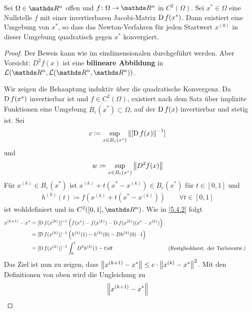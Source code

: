 \begin{Satze}
  Sei $\Omega\in\R^n$ offen und $f\colon\Omega\to\Ren$ in $C^2(\Omega)$.
  Sei $x^{*}\in\Omega $ eine Nullstelle $f$ 
  mit einer invertierbaren Jacobi-Matrix $\D f(x^{*})$.
  Dann existiert eine Umgebung von $x^{*}$, so dass das Newton-Verfahren 
  für jeden Startwert $x^{(0)}$ in dieser Umgebung
  quadratisch gegen $x^{*}$ konvergiert.
\end{Satze}

\begin{proof}
  Der Beweis kann wie im eindimensionalen durchgeführt werden.
  Aber Vorsicht: $D^2f(x)$ ist eine \textbf{bilineare Abbildung} in 
  $\mathcal{L}(\Ren, \mathcal{L}(\Ren, \Ren))$.
  
  Wir zeigen die Behauptung induktiv über die quadratische Konvergenz.
  Da $\D f(x^{*})$ invertierbar ist und $f\in C^2(\Omega) $,
  existiert nach dem Satz über implizite Funktionen
  eine Umgebung $\overline{B_\varepsilon(x^{*})}\subset \Omega$,
  auf der $\D f(x)$ invertierbar und stetig ist. Sei 
  \begin{gather*}
    c\coloneqq \sup_{x\in B_\varepsilon(x^{*})} \nn[[\D f(x)]^{-1}]
  \end{gather*}
  und 
  \begin{gather*}
    w\coloneqq \sup_{x\in B_\varepsilon(x^{*})}\nn[D^2f(x)]
  \end{gather*}
  Für $x^{(k)}\in B_\varepsilon(x^{*}) $ ist 
  $x^{(k)}+t(x^{*}-x^{(k)})\in B_\varepsilon(x^{*})$
  für $t\in [0,1]$ und 
  \begin{gather*}
    h^{(k)}(t) \coloneqq f(x^{(k)}+ t(x^{*}-x^{(k)}))\qquad \forall t\in [0,1]
  \end{gather*}
  ist wohldefiniert und in $C^2([0,1], \Ren)$.
  Wie in \ref{5.4.2} folgt 
  \begin{align*}
    x^{(k+1)}-x^{*} 
    &= [\D f(x^{(k)})]^{-1}\left(
      f(x^{*})-f(x^{(k)})-\D f(x^{(k)})(x^{*}-x^{(k)})
      \right)\\
    &= [\D f(x^{(k)})]^{-1}\left( 
      h^{(k)}(1)-h^{(k)}(0)-Dh^{(k)}(0)\cdot 1
      \right)\\
    &= [\D f(x^{(k)})]^{-1}\int_{0}^{1}D^2h^{(k)}(1-t)dt 
    &&\text{(Restglieddarst. der Taylorentw.)}
  \end{align*}
  Das Ziel ist nun zu zeigen, dass $\nn[x^{(k+1)}-x^{*}] \leq c\cdot \nn[x^{(k)}-x^{*}]^2$.
  Mit den Definitionen von oben wird die Ungleichung zu
  \begin{align}\nonumber
    \nn[x^{(k+1)}-x^{*}]

\end{align}
\end{proof}
